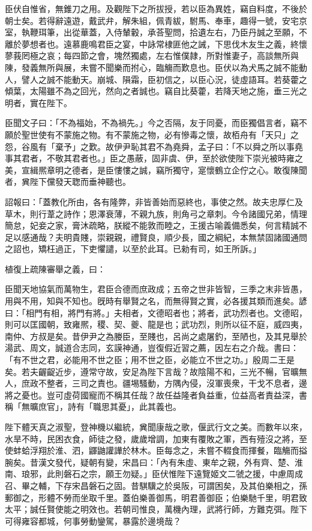 \begin{pinyinscope}
臣伏自惟省，無錐刀之用。及觀陛下之所拔授，若以臣為異姓，竊自料度，不後於朝士矣。若得辭遠遊，戴武弁，解朱組，佩青紱，駙馬、奉車，趣得一號，安宅京室，執鞭珥筆，出從華蓋，入侍輦轂，承荅聖問，拾遺左右，乃臣丹誠之至願，不離於夢想者也。遠慕鹿鳴君臣之宴，中詠常棣匪他之誡，下思伐木友生之義，終懷蓼莪罔極之哀；每四節之會，塊然獨處，左右惟僕隷，所對惟妻子，高談無所與陳，發義無所與展，未嘗不聞樂而拊心，臨觴而歎息也。臣伏以為犬馬之誠不能動人，譬人之誠不能動天。崩城、隕霜，臣初信之，以臣心況，徒虛語耳。若葵藿之傾葉，太陽雖不為之回光，然向之者誠也。竊自比葵藿，若降天地之施，垂三光之明者，實在陛下。


臣聞文子曰：「不為福始，不為禍先。」今之否隔，友于同憂，而臣獨倡言者，竊不願於聖世使有不蒙施之物。有不蒙施之物，必有慘毒之懷，故栢舟有「天只」之怨，谷風有「棄予」之歎。故伊尹恥其君不為堯舜，孟子曰：「不以舜之所以事堯事其君者，不敬其君者也。」臣之愚蔽，固非虞、伊，至於欲使陛下崇光被時雍之美，宣緝熈章明之德者，是臣慺慺之誠，竊所獨守，寔懷鶴立企佇之心。敢復陳聞者，兾陛下儻發天聦而垂神聽也。


詔報曰：「蓋教化所由，各有隆弊，非皆善始而惡終也，事使之然。故夫忠厚仁及草木，則行葦之詩作；恩澤衰薄，不親九族，則角弓之章刺。今令諸國兄弟，情理簡怠，妃妾之家，膏沐疏略，朕縱不能敦而睦之，王援古喻義備悉矣，何言精誠不足以感通哉？夫明貴賤，崇親親，禮賢良，順少長，國之綱紀，本無禁固諸國通問之詔也，矯枉過正，下吏懼譴，以至於此耳。已勑有司，如王所訴。」


植復上疏陳審舉之義，曰：


臣聞天地協氣而萬物生，君臣合德而庶政成；五帝之世非皆智，三季之末非皆愚，用與不用，知與不知也。旣時有舉賢之名，而無得賢之實，必各援其類而進矣。諺曰：「相門有相，將門有將。」夫相者，文德昭者也；將者，武功烈者也。文德昭，則可以匡國朝，致雍熈，稷、契、夔、龍是也；武功烈，則所以征不庭，威四夷，南仲、方叔是矣。昔伊尹之為媵臣，至賤也，呂尚之處屠釣，至陋也，及其見舉於湯武、周文，誠道合志同，玄謨神通，豈復假近習之薦，因左右之介哉。書曰：「有不世之君，必能用不世之臣；用不世之臣，必能立不世之功。」殷周二王是矣。若夫齷齪近步，遵常守故，安足為陛下言哉？故陰陽不和，三光不暢，官曠無人，庶政不整者，三司之責也。疆埸騷動，方隅內侵，沒軍喪衆，干戈不息者，邊將之憂也。豈可虛荷國寵而不稱其任哉？故任益隆者負益重，位益高者責益深，書稱「無曠庶官」，詩有「職思其憂」，此其義也。


陛下體天真之淑聖，登神機以繼統，兾聞康哉之歌，偃武行文之美。而數年以來，水旱不時，民困衣食，師徒之發，歲歲增調，加東有覆敗之軍，西有殪沒之將，至使蚌蛤浮翔於淮、泗，鼲鼬讙譁於林木。臣每念之，未嘗不輟食而揮餐，臨觴而搤腕矣。昔漢文發代，疑朝有變，宋昌曰：「內有朱虛、東牟之親，外有齊、楚、淮南、琅邪，此則磐石之宗，願王勿疑。」臣伏惟陛下遠覽姬文二虢之援，中慮周成召、畢之輔，下存宋昌磐石之固。昔騏驥之於吳阪，可謂困矣，及其伯樂相之，孫郵御之，形體不勞而坐取千里。蓋伯樂善御馬，明君善御臣；伯樂馳千里，明君致太平；誠任賢使能之明效也。若朝司惟良，萬機內理，武將行師，方難克弭。陛下可得雍容都城，何事勞動鑾駕，暴露於邊境哉？



\end{pinyinscope}
